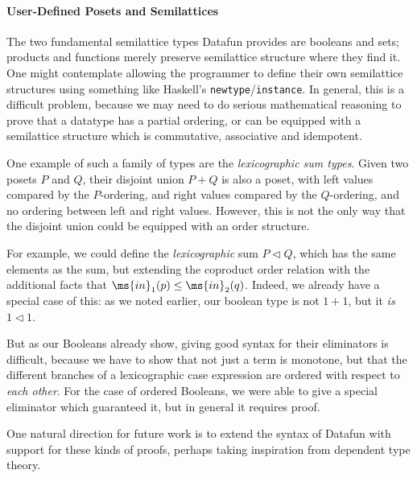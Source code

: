 \paragraph{User-Defined Posets and Semilattices}
The two fundamental semilattice types Datafun provides are booleans and sets;
products and functions merely preserve semilattice structure where they find
it. One might contemplate allowing the programmer to define their own
semilattice structures using something like Haskell's
\texttt{newtype}/\texttt{instance}. In general, this is a difficult
problem, because we may need to do serious mathematical
reasoning to prove that a datatype has a partial ordering, or can be
equipped with a semilattice structure which is commutative, associative
and idempotent.

One example of such a family of types are the \emph{lexicographic sum
  types}. Given two posets $P$ and $Q$, their disjoint union $P + Q$
is also a poset, with left values compared by the $P$-ordering, and
right values compared by the $Q$-ordering, and no ordering between
left and right values. However, this is not the only way that the
disjoint union could be equipped with an order structure.

For example, we could define the \emph{lexicographic} sum $P \lhd Q$,
which has the same elements as the sum, but extending the coproduct order
relation with the additional
facts that $\ms{in}_1(p) \leq \ms{in}_2(q)$. Indeed, we already have a
special case of this: as we noted earlier, our boolean type is not $1
+ 1$, but it \emph{is} $1 \lhd 1$.

But as our Booleans already show, giving good syntax for their
eliminators is difficult, because we have to show that not just a term
is monotone, but that the different branches of a lexicographic case
expression are ordered with respect to \emph{each other}. For the case
of ordered Booleans, we were able to give a special eliminator which
guaranteed it, but in general it requires proof.

One natural direction for future work is to extend the syntax of
Datafun with support for these kinds of proofs, perhaps taking
inspiration from dependent type theory.
